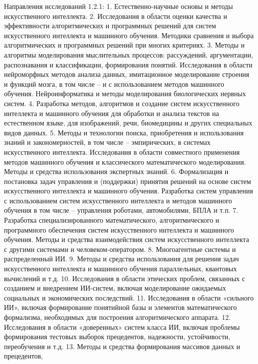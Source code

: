 \iffalse
Направления исследований 1.2.1:
1. Естественно-научные основы и методы искусственного интеллекта.
2. Исследования в области оценки качества и эффективности
алгоритмических и программных решений для систем искусственного
интеллекта и машинного обучения. Методики сравнения и выбора
алгоритмических и программных решений при многих критериях.
3. Методы и алгоритмы моделирования мыслительных процессов:
рассуждений, аргументации, распознавания и классификации, формирования
понятий. Исследования в области нейроморфных методов анализа данных,
имитационное моделирование строения и функций мозга, в том числе – и с
использованием методов машинного обучения. Нейроинформатика и методы
моделирования биологических нервных систем.
4. Разработка методов, алгоритмов и создание систем искусственного
интеллекта и машинного обучения для обработки и анализа текстов на
естественном языке, для изображений, речи, биомедицины и других
специальных видов данных.
5. Методы и технологии поиска, приобретения и использования знаний и
закономерностей, в том числе – эмпирических, в системах искусственного
интеллекта. Исследования в области совместного применения методов
машинного обучения и классического математического моделирования.
Методы и средства использования экспертных знаний.
6. Формализация и постановка задач управления и (поддержки) принятия
решений на основе систем искусственного интеллекта и машинного обучения.
Разработка систем управления с использованием систем искусственного
интеллекта и методов машинного обучения в том числе – управления роботами,
автомобилями, БПЛА и т.п.
7. Разработка специализированного математического, алгоритмического и
программного обеспечения систем искусственного интеллекта и машинного
обучения. Методы и средства взаимодействия систем искусственного
интеллекта с другими системами и человеком-оператором.
8. Многоагентные системы и распределенный ИИ.
9. Методы и средства использования для решения задач искусственного
интеллекта и машинного обучения параллельных, квантовых вычислений и т.д.
10. Исследования в области этических проблем, связанных с созданием и
внедрением ИИ-систем, включая моделирование ожидаемых социальных и
экономических последствий.
11. Исследования в области «сильного ИИ», включая формирование
понятийной базы и элементов математического формализма, необходимых для
построения алгоритмического аппарата.
12. Исследования в области «доверенных» систем класса ИИ, включая
проблемы формирования тестовых выборок прецедентов, надежности,
устойчивости, переобучения и т.д.
13. Методы и средства формирования массивов данных и прецедентов,
